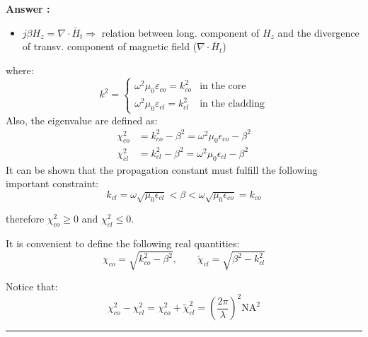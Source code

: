 \documentclass[a4paper,11pt]{book}
\newcounter{qacount}
\newenvironment{answer}{
  \noindent\textbf{Answer \theqacount:}\space
}{
  \par\vspace{1em}   %
  \hrule             %
  \vspace{0.5em}     %
}
\begin{document}
\begin{answer}
\begin{itemize}
        \item[\textbf{[3b]}] $j \beta H_z = \nabla \cdot \bar{H}_t \Rightarrow$ relation between long. component of $H_z$ and the divergence of transv. component of magnetic field ($\nabla \cdot \bar{H}_t$)
    \end{itemize}
    where:
    \begin{equation*}
        k^2 =
        \begin{cases}
            \omega^2 \mu_0 \varepsilon_{co} = k_{co}^2 & \text{in the core}     \\
            \omega^2 \mu_0 \varepsilon_{cl} = k_{cl}^2 & \text{in the cladding}
        \end{cases}
    \end{equation*}
    Also, the eigenvalue are defined as:
    \begin{align*}
        \chi_{co}^2 & = k_{co}^2 - \beta^2 = \omega^2 \mu_0 \epsilon_{co} - \beta^2 \\
        \chi_{cl}^2 & = k_{cl}^2 - \beta^2 = \omega^2 \mu_0 \epsilon_{cl} - \beta^2
    \end{align*}
    \noindent It can be shown that the propagation constant must fulfill the following important constraint:
    \begin{equation*}
        k_{cl} = \omega \sqrt{\mu_0 \epsilon_{cl}} < \beta < \omega \sqrt{\mu_0 \epsilon_{co}} = k_{co}
    \end{equation*}

    \noindent therefore $\chi_{co}^2 \geq 0$ and $\chi_{cl}^2 \leq 0$.

    \vspace{1em}
    \noindent It is convenient to define the following real quantities:
    \begin{equation*}
        \chi_{co} = \sqrt{k_{co}^2 - \beta^2}, \quad \quad \tilde{\chi}_{cl} = \sqrt{\beta^2 - k_{cl}^2}
    \end{equation*}

    \noindent Notice that:
    \begin{equation*}
        \chi_{co}^2 - \chi_{cl}^2 = \chi_{co}^2 + \tilde{\chi}_{cl}^2 = \left( \frac{2\pi}{\lambda} \right)^2 \text{NA}^2
    \end{equation*}


\end{answer}
\end{document}
